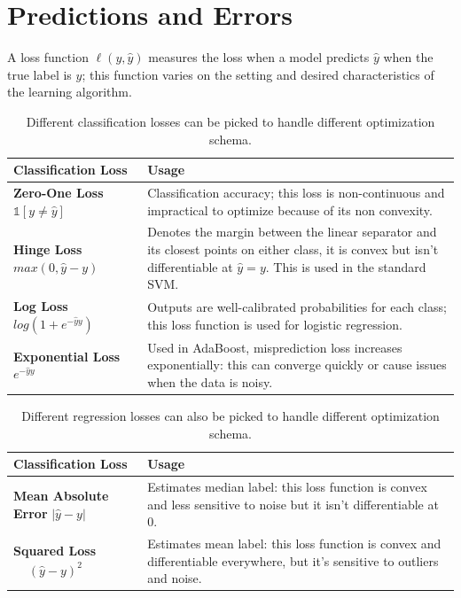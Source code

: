 \section{Predictions and Errors}
A loss function $\ell(y, \hat{y})$ measures the loss when a model predicts $\hat{y}$ when the true label is $y$; this function varies on the setting and desired characteristics of the learning algorithm.  

\begin{table}[ht] 
\centering
  \selectfont
  \begin{tabular}{p{0.3\linewidth} | p{0.7\linewidth}}
    \toprule
    Classification Loss & Usage \\
    \midrule
    \textbf{Zero-One Loss} $\mathbb{1}[y\not=\hat{y}]$ & Classification accuracy; this loss is non-continuous and impractical to optimize because of its non convexity. \\
    \textbf{Hinge Loss} $max(0, \hat{y} - y)$ & Denotes the margin between the linear separator and its closest points on either class, it is convex but isn't differentiable at $\hat{y}=y$.  This is used in the standard SVM. \\
    \textbf{Log Loss} $log(1 + e^{-\hat{y}y})$ & Outputs are well-calibrated probabilities for each class; this loss function is used for logistic regression. \\
    \textbf{Exponential Loss} $e^{-\hat{y}y}$ & Used in AdaBoost, misprediction loss increases exponentially: this can converge quickly or cause issues when the data is noisy. \\
    \bottomrule
  \end{tabular}
  \caption{Different classification losses can be picked to handle different optimization schema.}
  \label{tab:normaltab}
\end{table}

\begin{table}[ht] %
  \centering
  \selectfont
  \begin{tabular}{p{0.3\linewidth} | p{0.7\linewidth}}
    \toprule
    Classification Loss & Usage \\
    \midrule
    \textbf{Mean Absolute Error} $\left|\hat y-y\right|$ & Estimates median label: this loss function is convex and less sensitive to noise but it isn't differentiable at 0. \\
    \textbf{Squared Loss} $\begin{aligned}
&\left(\hat y - y\right)^{2} 
\end{aligned}$ & Estimates mean label: this loss function is convex and differentiable everywhere, but it's sensitive to outliers and noise. \\
    \bottomrule
  \end{tabular}
  \caption{Different regression losses can also be picked to handle different optimization schema.}
  \label{tab:othertab}
\end{table}

